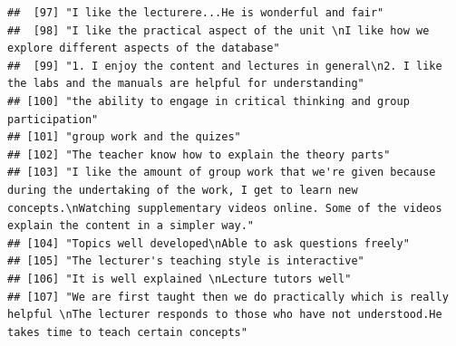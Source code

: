 \documentclass[
]{article}
\begin{document}
\begin{verbatim}
##  [97] "I like the lecturere...He is wonderful and fair"                                                                                                                                                                                                  
##  [98] "I like the practical aspect of the unit \nI like how we explore different aspects of the database"                                                                                                                                                
##  [99] "1. I enjoy the content and lectures in general\n2. I like the labs and the manuals are helpful for understanding"                                                                                                                                 
## [100] "the ability to engage in critical thinking and group participation"                                                                                                                                                                               
## [101] "group work and the quizes"                                                                                                                                                                                                                        
## [102] "The teacher know how to explain the theory parts"                                                                                                                                                                                                 
## [103] "I like the amount of group work that we're given because during the undertaking of the work, I get to learn new concepts.\nWatching supplementary videos online. Some of the videos explain the content in a simpler way."                        
## [104] "Topics well developed\nAble to ask questions freely"                                                                                                                                                                                              
## [105] "The lecturer's teaching style is interactive"                                                                                                                                                                                                     
## [106] "It is well explained \nLecture tutors well"                                                                                                                                                                                                       
## [107] "We are first taught then we do practically which is really helpful \nThe lecturer responds to those who have not understood.He takes time to teach certain concepts"                                                                              

\end{verbatim}
\end{document}
